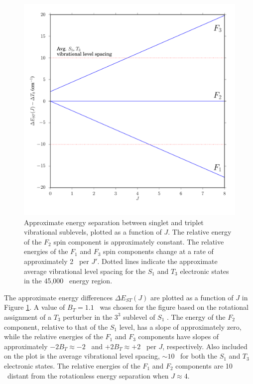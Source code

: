 \documentclass[12pt]{mitthesis}
\begin{document}
\begin{figure}
  \caption{Approximate energy separation between singlet and triplet
    vibrational sublevels, plotted as a function of $J$.  The relative
    energy of the $F_2$ spin component is approximately constant.  The
    relative energies of the $F_1$ and $F_3$ spin components change at
    a rate of approximately 2 \rcm\ per $J'$.  Dotted lines indicate
    the approximate average vibrational level spacing for the $S_1$
    and $T_3$ electronic states in the 45,000 \rcm\ energy region.}
  \label{fig:rotational-energy-differences}
  \centering
  \includegraphics[width=6in]{rotational-energy-differences.pdf}
\end{figure}

The approximate energy differences $\Delta E_{ST}(J)$ are plotted as a
function of $J$ in Figure \ref{fig:rotational-energy-differences}.  A
value of $B_T=1.1$ \rcm\ was chosen for the figure based on the
rotational assignment of a $T_3$ perturber in the $3^3$ 
sublevel of $S_1$ \cite{mishra04}.  The energy of the $F_2$ component,
relative to that of the $S_1$ level, has a slope of approximately
zero, while the relative energies of the $F_1$ and $F_3$ components
have slopes of approximately $-2B_T \approx -2$ \rcm\ and $+2B_T
\approx +2$ \rcm\ per $J$, respectively.  Also included on the plot is
the average vibrational level spacing, $\sim 10$ \rcm\, for both the
$S_1$ and $T_3$ electronic states.  The relative energies of the $F_1$
and $F_2$ components are 10 \rcm\ distant from the rotationless energy
separation when $J \approx 4$.
\end{document}

